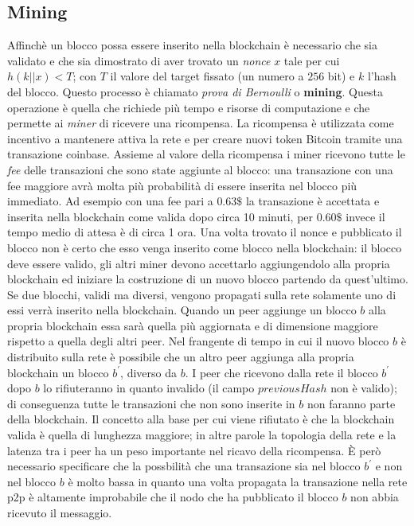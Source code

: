 \begin{enumerate}[1.]
\section{Mining}
Affinchè un blocco possa essere inserito nella blockchain è necessario che sia validato e che sia dimostrato di aver trovato un \textit{nonce} $x$ tale per cui $h(k||x)<T$; con $T$ il valore del target fissato (un numero a $256$ bit) e $k$ l'hash del blocco. Questo processo è chiamato \textit{prova di Bernoulli} o \textbf{mining}.\newline
Questa operazione è quella che richiede più tempo e risorse di computazione e che permette ai \textit{miner} di ricevere una ricompensa.\newline
La ricompensa è utilizzata come incentivo a mantenere attiva la rete e per creare nuovi token Bitcoin tramite una transazione coinbase. Assieme al valore della ricompensa i miner ricevono tutte le \textit{fee} delle transazioni che sono state aggiunte al blocco: una transazione con una fee maggiore avrà molta più probabilità di essere inserita nel blocco più immediato. Ad esempio con una fee pari a $0.63\$$ la transazione è accettata e inserita nella blockchain come valida dopo circa 10 minuti, per $0.60\$$ invece il tempo medio di attesa è di circa 1 ora.\newline
Una volta trovato il nonce e pubblicato il blocco non è certo che esso venga inserito come blocco nella blockchain: il blocco deve essere valido, gli altri miner devono accettarlo aggiungendolo alla propria blockchain ed iniziare la costruzione di un nuovo blocco partendo da quest'ultimo. Se due blocchi, validi ma diversi, vengono propagati sulla rete solamente uno di essi verrà inserito nella blockchain. Quando un peer aggiunge un blocco $b$ alla propria blockchain essa sarà quella più aggiornata e di dimensione maggiore rispetto a quella degli altri peer. Nel frangente di tempo in cui il nuovo blocco $b$ è distribuito sulla rete è possibile che un altro peer aggiunga alla propria blockchain un blocco $b^'$, diverso da $b$. I peer che ricevono dalla rete il blocco $b^'$ dopo $b$ lo rifiuteranno in quanto invalido (il campo $previousHash$ non è valido); di conseguenza tutte le transazioni che non sono inserite in $b$ non faranno parte della blockchain. Il concetto alla base per cui viene rifiutato è che la blockchain valida è quella di lunghezza maggiore; in altre parole la topologia della rete e la latenza tra i peer ha un peso importante nel ricavo della ricompensa. È però necessario specificare che la possbilità che una transazione sia nel blocco $b^'$ e non nel blocco $b$ è molto bassa in quanto una volta propagata la transazione nella rete p2p è altamente improbabile che il nodo che ha pubblicato il blocco $b$ non abbia ricevuto il messaggio.\newline\newline

\end{enumerate}
